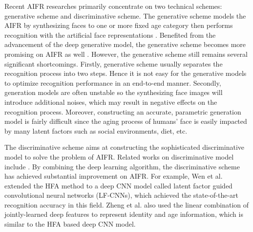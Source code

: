 \documentclass[runningheads]{llncs}
\begin{document}
Recent AIFR researches primarily concentrate on two technical schemes: generative scheme and discriminative scheme. The generative scheme models the AIFR by synthesizing faces to one or more fixed age category then performs recognition with the artificial face representations \cite{g1,g2,g3}. Benefited from the advancement of the deep generative model, the generative scheme becomes more promising on AIFR as well  \cite{caae,cgan,TNVP}.
However, the generative scheme still remains several significant shortcomings.
Firstly, generative scheme usually separates the recognition process into two steps. Hence it is not easy for the generative models to optimize recognition performance in an end-to-end manner.
Secondly, generation models are often unstable so the synthesizing face images will introduce additional noises, which may result in negative effects on the recognition process.
Moreover, constructing an accurate, parametric generation model is fairly difficult since the aging process of humans' face is easily impacted by many latent factors such as social environments, diet, etc.

The discriminative scheme aims at constructing the sophisticated discriminative model to solve the problem of AIFR. Related works on discriminative model include \cite{mefa,lps_hfa,gsm,chen2013blessing,d1,d2,cacd,cacd2,hfa}. By combining the deep learning algorithm, the discriminative scheme has achieved substantial improvement on AIFR.
For example, Wen et al. \cite{LFCNN} extended the HFA method \cite{hfa} to a deep CNN model called latent factor guided convolutional neural networks (LF-CNNs), which achieved the state-of-the-art recognition accuracy in this field.
Zheng et al. \cite{AECNN} also used the linear combination of jointly-learned deep features to represent identity and age information, which is similar to the HFA based deep CNN model.

\end{document}
